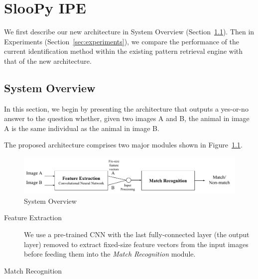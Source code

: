 \graphicspath{{images/chap7/}}
\chapter{SlooPy IPE} %
\label{cha:sloopy_ipe}

We first describe our new architecture in System Overview
(Section~\ref{sec:system_overview}). Then in Experiments
(Section~\ref{sec:experiments}), we compare the performance of the current
identification method within the existing pattern retrieval engine with that of
the new architecture.

\section{System Overview} %
\label{sec:system_overview}

In this section, we begin by presenting the architecture that outputs a
yes-or-no answer to the question whether, given two images A and B, the animal
in image A is the same individual as the animal in image B.

The proposed architecture comprises two major modules shown in
Figure~\ref{fig:cnn_overview}.

\begin{figure}[htb]
  \centering
  \includegraphics[width=\textwidth]{system/overview}
  \caption{System Overview}
  \label{fig:cnn_overview} %
\end{figure}

\begin{description}
    \item[Feature Extraction] We use a pre-trained CNN with the last
        fully-connected layer (the output layer) removed to extract fixed-size feature
  vectors from the input images before feeding them into the \emph{Match
  Recognition} module.
  \item[Match Recognition]
\end{description}

